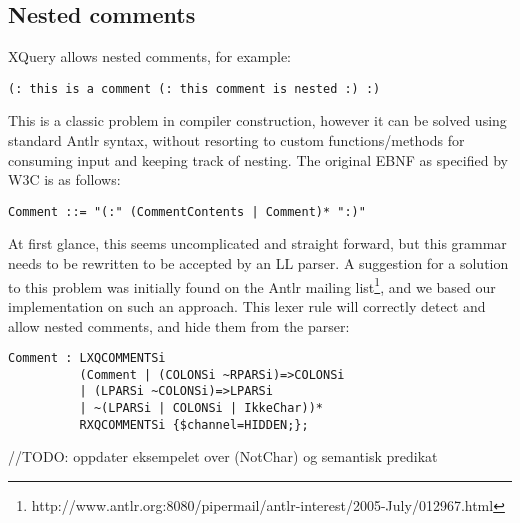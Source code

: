 \subsection{Nested comments}
XQuery allows nested comments, for example:
\begin{verbatim}
(: this is a comment (: this comment is nested :) :)
\end{verbatim}
This is a classic problem in compiler construction, however it can be solved
using standard Antlr syntax, without resorting to custom functions/methods for
consuming input and keeping track of nesting. The original EBNF as specified by
W3C is as follows:
\begin{verbatim}
Comment ::= "(:" (CommentContents | Comment)* ":)"
\end{verbatim}
At first glance, this seems uncomplicated and straight forward, but this grammar
needs to be rewritten to be accepted by an LL parser. A suggestion for a 
solution to this problem was initially found on the Antlr mailing
list\footnote{http://www.antlr.org:8080/pipermail/antlr-interest/2005-July/012967.html},
and we based our implementation on such an approach. This lexer rule will
correctly detect and allow nested comments, and hide them from the parser:
\begin{verbatim}	
Comment : LXQCOMMENTSi 
          (Comment | (COLONSi ~RPARSi)=>COLONSi 
          | (LPARSi ~COLONSi)=>LPARSi 
          | ~(LPARSi | COLONSi | IkkeChar))* 
          RXQCOMMENTSi {$channel=HIDDEN;};
\end{verbatim}
//TODO: oppdater eksempelet over (NotChar) og semantisk predikat